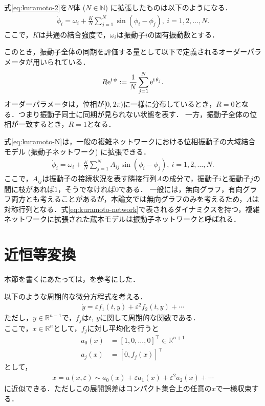 \documentclass[../main]{subfiles}
\begin{document}
式\eqref{eq:kuramoto-2}を$N$体 ($N\in\mathbb{N}$) に拡張したものは以下のようになる．
\begin{align}
    \label{eq:kuramoto-N}
    \dot{\phi}_i=\omega_i+\frac{K}{N}\sum_{j=1}^N\sin(\phi_i-\phi_j),\ i=1,2,\ldots,N.
\end{align}
ここで，$K$は共通の結合強度で，$\omega_i$は振動子$i$の固有振動数とする．

このとき，振動子全体の同期を評価する量として以下で定義されるオーダーパラメータが用いられている．
\begin{align}
    R\mathrm{e}^{{\mathrm i\,} \psi}:=\frac{1}{N}\sum_{j=1}^N\mathrm{e}^{{\mathrm i\,} \theta_j}.    
\end{align}
オーダーパラメータは，位相が$[0,2\pi)$に一様に分布しているとき，$R= 0$となる．つまり振動子同士に同期が見られない状態を表す．
一方，振動子全体の位相が一致するとき，$R=1$となる．

式\eqref{eq:kuramoto-N}は，一般の複雑ネットワークにおける位相振動子の大域結合モデル (振動子ネットワーク) に拡張できる．
\begin{align}
    \label{eq:kuramoto-network}
    \dot{\phi}_i=\omega_i+\frac{K}{N}\sum_{j=1}^NA_{ij}\sin(\phi_i-\phi_j),\ i=1,2,\ldots,N.
\end{align}
ここで，$A_{ij}$は振動子の接続状況を表す隣接行列$A$の成分で，振動子$i$と振動子$j$の間に枝があれば$1$，そうでなければ$0$である．
一般には，無向グラフ，有向グラフ両方とも考えることがあるが，本論文では無向グラフのみを考えるため，$A$は対称行列となる．式\eqref{eq:kuramoto-network}で表されるダイナミクスを持つ，複雑ネットワークに拡張された蔵本モデルは振動子ネットワークと呼ばれる．
\section{近恒等変換}
本節を書くにあたっては，\cite{james2003}を参考にした．

以下のような周期的な微分方程式を考える．
\begin{align*}
    \dot{y}=\varepsilon f_1(t,y)+\varepsilon^2f_2(t,y)+\cdots
\end{align*}
ただし，$y\in\mathbb{R}^{n-1}$で，$f_j$は$t,\ y$に関して周期的な関数である．\\
ここで，$x\in\mathbb{R}^{n}$として，$f_j$に対し平均化を行うと
\begin{align*}
    a_0(x)&=[1,0,\ldots,0]^\top\in\mathbb{R}^{n+1}\\
    a_j(x)&=[0,f_j(x)]^\top
\end{align*}
として，
\begin{align*}
    \dot{x}=a(x,\varepsilon)\sim a_0(x)+\varepsilon a_1(x)+\varepsilon^2 a_2(x)+\cdots
\end{align*}
に近似できる．ただしこの展開誤差はコンパクト集合上の任意の$x$で一様収束する．
\end{document}

